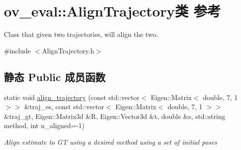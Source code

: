 \hypertarget{classov__eval_1_1AlignTrajectory}{}\section{ov\+\_\+eval\+:\+:Align\+Trajectory类 参考}
\label{classov__eval_1_1AlignTrajectory}


Class that given two trajectories, will align the two.  




{\ttfamily \#include $<$Align\+Trajectory.\+h$>$}

\subsection*{静态 Public 成员函数}
\begin{DoxyCompactItemize}
\item 
static void \hyperlink{classov__eval_1_1AlignTrajectory_ac4ea2100e9e28dc54299569b97b698a3}{align\+\_\+trajectory} (const std\+::vector$<$ Eigen\+::\+Matrix$<$ double, 7, 1 $>$$>$ \&traj\+\_\+es, const std\+::vector$<$ Eigen\+::\+Matrix$<$ double, 7, 1 $>$$>$ \&traj\+\_\+gt, Eigen\+::\+Matrix3d \&R, Eigen\+::\+Vector3d \&t, double \&s, std\+::string method, int n\+\_\+aligned=-\/1)
\begin{DoxyCompactList}\small\item\em Align estimate to GT using a desired method using a set of initial poses \end{DoxyCompactList}\end{DoxyCompactItemize}
